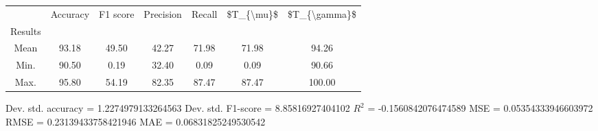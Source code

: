 \begin{tabular}{|c|c|c|c|c|c|c|}
\toprule
{} &  Accuracy &  F1 score &  Precision &  Recall &  \$T\_\{\textbackslash mu\}\$ &  \$T\_\{\textbackslash gamma\}\$ \\
Results &           &           &            &         &            &               \\
\hline
Mean    &     93.18 &     49.50 &      42.27 &   71.98 &      71.98 &         94.26 \\
Min.    &     90.50 &      0.19 &      32.40 &    0.09 &       0.09 &         90.66 \\
Max.    &     95.80 &     54.19 &      82.35 &   87.47 &      87.47 &        100.00 \\
\bottomrule
\end{tabular}

 Dev. std. accuracy = 1.2274979133264563
 Dev. std. F1-score = 8.85816927404102
 $R^2$ = -0.1560842076474589
 MSE = 0.05354333946603972
 RMSE = 0.23139433758421946
 MAE = 0.06831825249530542